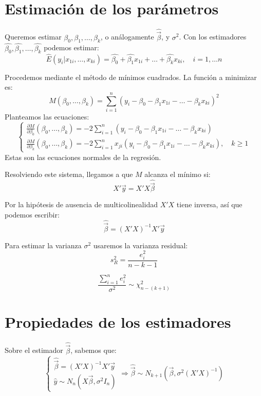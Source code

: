 \section{Estimación de los parámetros}
Queremos estimar $\beta_0, \beta_1, \dots, \beta_k$, o análogamente $\hat{\vec{\beta}}$, y $\sigma^2$.
Con los estimadores $\hat{\beta_0}, \hat{\beta_1}, \dots, \hat{\beta_k}$ podemos estimar:
$$\hat{E}(y_i | x_{1i}, \dots, x_{ki}) = \hat{\beta_0} + \hat{\beta_1}x_{1i} + \dots + \hat{\beta_k}x_{ki}, \quad i = 1, \dots n$$

Procedemos mediante el método de mínimos cuadrados.
La función a minimizar es:
$$M(\beta_0, \dots, \beta_k) = \sum_{i=1}^n (y_i - \beta_0 - \beta_1x_{1i} - \dots - \beta_kx_{ki})^2$$
Planteamos las ecuaciones:
$$\begin{cases}
        \frac{\partial M}{\partial \beta_0} (\beta_0, \dots, \beta_k) = -2\sum_{i=1}^n (y_i - \beta_0 - \beta_1x_{1i} - \dots - \beta_kx_{ki}) \\
        \frac{\partial M}{\partial \beta_k} (\beta_0, \dots, \beta_k) = -2\sum_{i=1}^n x_{ji}(y_i - \beta_0 - \beta_1x_{1i} - \dots - \beta_kx_{ki}), \quad k \geq 1
    \end{cases}$$
Estas son las ecuaciones normales de la regresión.

Resolviendo este sistema, llegamos a que $M$ alcanza el mínimo si:
$$X'\vec{y} = X'X\hat{\vec{\beta}}$$

Por la hipótesis de ausencia de multicolinealidad $X'X$ tiene inversa, así que podemos escribir:
$$\hat{\vec{\beta}} = (X'X)^{-1}X'\vec{y}$$

Para estimar la varianza $\sigma^2$ usaremos la varianza residual:
$$s_R^2 = \frac{e_i^2}{n-k-1}$$

\begin{note}
    $$\frac{\sum_{i=1}^n e_i^2}{\sigma^2} \sim \chi^2_{n-(k+1)}$$
\end{note}

\section{Propiedades de los estimadores}
Sobre el estimador $\hat{\vec{\beta}}$, sabemos que:
$$\begin{cases}
        \hat{\vec{\beta}} = (X'X)^{-1}X'\vec{y} \\
        \hat{y} \sim N_n(X\vec{\beta}, \sigma^2 I_n)
    \end{cases} \Rightarrow \hat{\vec{\beta}} \sim N_{k+1}(\vec{\beta}, \sigma^2(X'X)^{-1})$$

